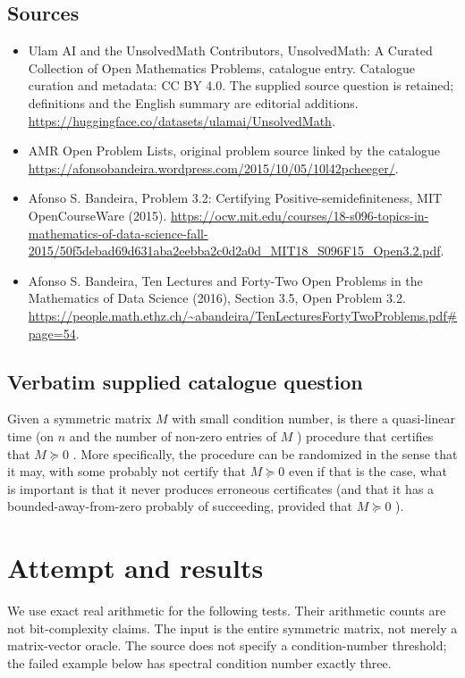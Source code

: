 \documentclass[11pt]{article}
\begin{document}
\subsection{Sources}
\begin{itemize}
\item[S1] Ulam AI and the UnsolvedMath Contributors, UnsolvedMath: A Curated Collection of Open Mathematics Problems, catalogue entry. Catalogue curation and metadata: CC BY 4.0. The supplied source question is retained; definitions and the English summary are editorial additions.
\url{https://huggingface.co/datasets/ulamai/UnsolvedMath}.
\item[S2] AMR Open Problem Lists, original problem source linked by the catalogue
\url{https://afonsobandeira.wordpress.com/2015/10/05/10l42pcheeger/}.
\item[S3] Afonso S. Bandeira, Problem 3.2: Certifying Positive-semidefiniteness, MIT OpenCourseWare (2015).
\url{https://ocw.mit.edu/courses/18-s096-topics-in-mathematics-of-data-science-fall-2015/50f5debad69d631aba2eebba2c0d2a0d_MIT18_S096F15_Open3.2.pdf}.
\item[S4] Afonso S. Bandeira, Ten Lectures and Forty-Two Open Problems in the Mathematics of Data Science (2016), Section 3.5, Open Problem 3.2.
\url{https://people.math.ethz.ch/~abandeira/TenLecturesFortyTwoProblems.pdf#page=54}.
\end{itemize}
\subsection{Verbatim supplied catalogue question}
Given a symmetric matrix ${M}$ with small condition number, is there a quasi-linear time (on ${n}$ and the number of non-zero entries of ${M}$ ) procedure that certifies that ${M\succeq 0}$ . More specifically, the procedure can be randomized in the sense that it may, with some probably not certify that ${M\succeq 0}$ even if that is the case, what is important is that it never produces erroneous certificates (and that it has a bounded-away-from-zero probably of succeeding, provided that ${M\succeq 0}$ ).

\section{Attempt and results}
We use exact real arithmetic for the following tests. Their arithmetic counts are
not bit-complexity claims. The input is the entire symmetric matrix, not merely
a matrix-vector oracle. The source does not specify a condition-number threshold;
the failed example below has spectral condition number exactly three.
\end{document}
